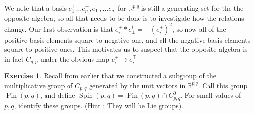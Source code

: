 \documentclass[psamsfonts]{amsart}
\theoremstyle{definition}
\newtheorem{exer}[thm]{Exercise}
\theoremstyle{remark}
\newcommand{\R}{\mathbb{R}}
\DeclareMathOperator{\Pin}{Pin}
\DeclareMathOperator{\Spin}{Spin}
\begin{document}
We note that a basis $e_1^+ \ldots e_p^+, e_1^- , \ldots e_q^-$ for $\R^{p|q}$ is still a generating set for the the opposite algebra, so all that needs to be done is to investigate how the relations change. Our first observation is that $e_i^\pm * e^i_\pm = -(e_i^\pm)^2$, so now all of the positive basis elements square to negative one, and all the negative basis elements square to positive ones. This motivates us to suspect that the opposite algebra is in fact $C_{q,p}$ under the obvious map $e_i^\pm \mapsto e_i^\mp$
%
\begin{exer}
Recall from earlier that we constructed a subgroup of the multiplicative group of $C_{p,q}$ generated by the unit vectors in $\R^{p|q}$. Call this group $\Pin(p,q)$, and define $\Spin(p,q) = \Pin(p,q) \cap C_{p,q}^0$. For small values of $p,q$, identify these groups. (Hint : They will be Lie groups).
\end{exer}
%
\setcounter{thm}{0}
%
\setcounter{section}{7}
%
\end{document}
